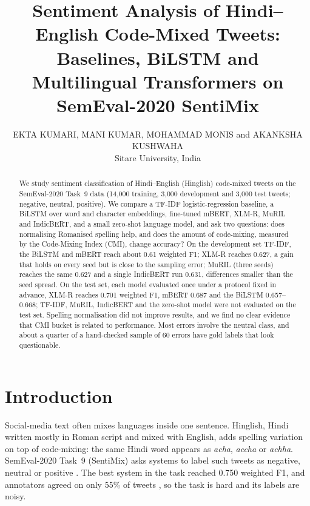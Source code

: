 \documentclass{nle}
\title[Sentiment Analysis of Hinglish Tweets]
      {Sentiment Analysis of Hindi--English Code-Mixed Tweets:\\ Baselines, BiLSTM and Multilingual Transformers on SemEval-2020 SentiMix}
\author[Ekta, Mani, Monis and Akanksha]
       {EKTA KUMARI, MANI KUMAR, MOHAMMAD MONIS and AKANKSHA KUSHWAHA\\
        Sitare University, India}
\begin{document}
\label{firstpage}
\maketitle

\begin{abstract}
We study sentiment classification of Hindi--English (Hinglish) code-mixed tweets on the SemEval-2020 Task~9 data
(14{,}000 training, 3{,}000 development and 3{,}000 test tweets; negative, neutral, positive). We compare a TF-IDF
logistic-regression baseline, a BiLSTM over word and character embeddings, fine-tuned mBERT, XLM-R, MuRIL and IndicBERT, and a
small zero-shot language model, and ask two questions: does normalising Romanised spelling help, and does the amount of
code-mixing, measured by the Code-Mixing Index (CMI), change accuracy? On the development set TF-IDF, the BiLSTM and
mBERT reach about 0.61 weighted F1; XLM-R reaches 0.627, a gain that holds on every seed but is close to the
sampling error; MuRIL (three seeds) reaches the same 0.627 and a single IndicBERT run 0.631, differences smaller than the
seed spread. On the test set, each model evaluated once under a protocol fixed in advance, XLM-R reaches 0.701 weighted F1, mBERT 0.687 and the BiLSTM 0.657--0.668; TF-IDF, MuRIL, IndicBERT and the zero-shot model were not evaluated on the test set. Spelling normalisation did not improve results, and we
find no clear evidence that CMI bucket is related to performance. Most errors involve the neutral class, and about a
quarter of a hand-checked sample of 60 errors have gold labels that look questionable.
\end{abstract}

\section{Introduction}
Social-media text often mixes languages inside one sentence. Hinglish, Hindi written mostly in Roman script
and mixed with English, adds spelling variation on top of code-mixing: the same Hindi word appears as
\emph{acha}, \emph{accha} or \emph{achha}. SemEval-2020 Task~9 (SentiMix) asks systems to label such tweets as
negative, neutral or positive \cite{patwa2020}. The best system in the task reached 0.750 weighted F1, and annotators
agreed on only 55\% of tweets \cite{patwa2020}, so the task is hard and its labels are noisy.
\end{document}
